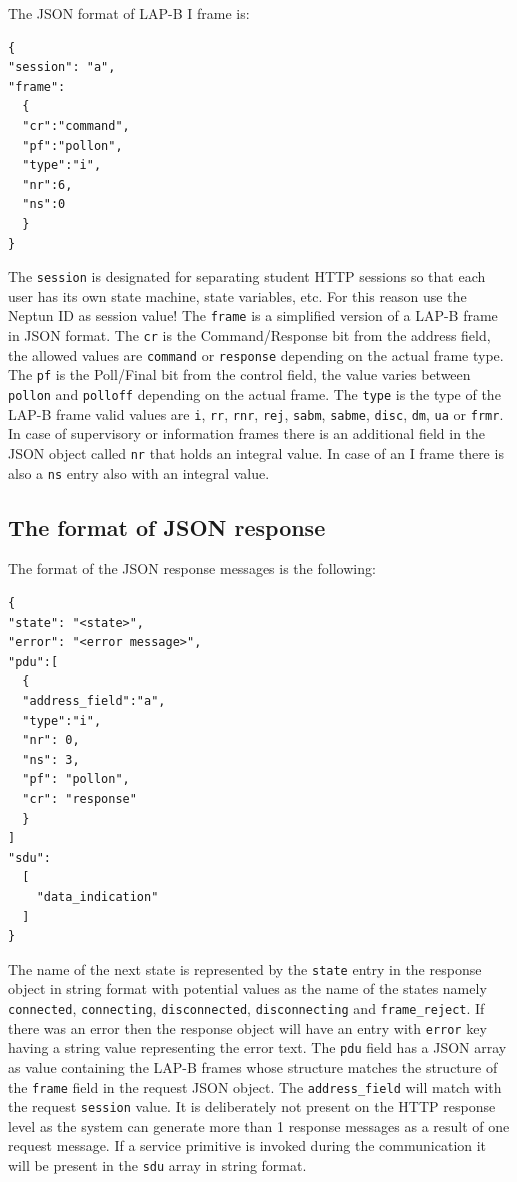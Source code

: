 \documentclass[a4paper]{article}
\begin{document}
The JSON format of LAP-B I frame is:
\begin{verbatim}
{
"session": "a", 
"frame": 
  {
  "cr":"command",
  "pf":"pollon",
  "type":"i",
  "nr":6,
  "ns":0
  }
}
\end{verbatim}

The \verb!session! is designated for separating student HTTP sessions so that each user has its own state
machine, state variables, etc. For this reason use the Neptun ID as session value!  The \verb!frame! is
a simplified version of a LAP-B
frame in JSON format. The \verb!cr! is the Command/Response bit from the address field, the allowed
values are \verb!command! or \verb!response! depending on the actual frame type. The
\verb!pf! is the Poll/Final bit from the control field, the value varies between
\verb!pollon! and \verb!polloff! depending on the actual frame. The
\verb!type! is the type of the LAP-B frame valid values are \verb!i!,
\verb!rr!, \verb!rnr!, \verb!rej!,
\verb!sabm!, \verb!sabme!, \verb!disc!, \verb!dm!,
\verb!ua! or
\verb!frmr!. In case of supervisory or information frames there is an additional field in the JSON
object called \verb!nr! that holds an integral value.
In case of an I frame there is also a \verb!ns! entry also with an integral value.

\subsection{The format of JSON response}

The format of the JSON response messages is the following:
\begin{verbatim}
{
"state": "<state>",
"error": "<error message>",
"pdu":[
  {
  "address_field":"a",
  "type":"i",
  "nr": 0,
  "ns": 3,
  "pf": "pollon",
  "cr": "response"
  }
]
"sdu":
  [
    "data_indication"
  ]
}
\end{verbatim}

The name of the next state is represented by the \verb!state! entry in the response object in string
format with potential values as the name of the states namely
\verb!connected!,
\verb!connecting!, \verb!disconnected!,
\verb!disconnecting! and \verb!frame_reject!.
If there was an error then the response object will have an entry with \verb!error! key having a string
value representing the error text.
The \verb!pdu! field has a JSON array as value containing the LAP-B frames whose structure matches
the structure of the \verb!frame! field in the request JSON object.
The \verb!address_field! will match with the request \verb!session! value. It is deliberately not
present on the HTTP response level as the system can generate more than 1 response messages as a result of one request
message. If a service primitive is invoked during the communication it will be present in the
\verb!sdu! array in string format.
\end{document}
